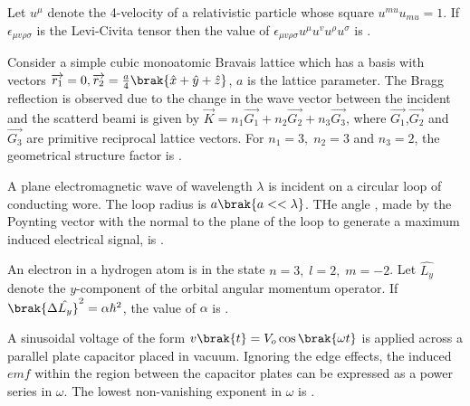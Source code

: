 \iffalse
                                        
\chapter{2020}
\section{ph}
\author{AI24BTECH11023 - Tarun Reddy Pakala}
\fi
\item Let $u^{\mu}$ denote the 4-velocity of a relativistic particle whose square $u^{mu}u_{mu}=1$. If $\epsilon_{\mu v\rho \sigma}$ is the Levi-Civita tensor then the value of $\epsilon_{\mu v\rho \sigma} u^{\mu} u^v u^{\rho} u^{\sigma}$ is \underline{\hspace{2cm}}.
\item Consider a simple cubic monoatomic Bravais lattice which has a basis with vectors $\overrightarrow{r_1}=0,\overrightarrow{r_2}=\frac{a}{4}\brak{\hat{x}+\hat{y}+\hat{z}}$, $a$ is the lattice parameter. The Bragg reflection is observed due to the change in the wave vector between the incident and the scatterd beami is given by $\overrightarrow{K}=n_1\overrightarrow{G_1}+n_2\overrightarrow{G_2}+n_3\overrightarrow{G_3}$, where $\overrightarrow{G_1}$,$\overrightarrow{G_2}$ and $\overrightarrow{G_3}$ are primitive reciprocal lattice vectors. For $n_1=3,\;n_2=3$ and $n_3=2$, the geometrical structure factor is \underline{\hspace{2cm}}.
\item A plane electromagnetic wave of wavelength $\lambda$ is incident on a circular loop of conducting wore. The loop radius is $a\brak{a<<\lambda}$. THe angle , made by the Poynting vector with the normal to the plane of the loop to generate a maximum induced electrical signal, is \underline{\hspace{2cm}}.
\item An electron in a hydrogen atom is in the state $n=3,\;l=2,\;m=-2$. Let $\hat{L_y}$ denote the $y$-component of the orbital angular momentum operator. If $\brak{\Delta\hat{L_y}}^2=\alpha\hbar^2$, the value of $\alpha$ is \underline{\hspace{2cm}}.
\item A sinusoidal voltage of the form $v\brak{t}=V_o\cos\brak{\omega t}$ is applied across a parallel plate capacitor placed in vacuum. Ignoring the edge effects, the induced $emf$ within the region between the capacitor plates can be expressed as a power series in $\omega$. The lowest non-vanishing exponent in $\omega$ is \underline{\hspace{2cm}}.
